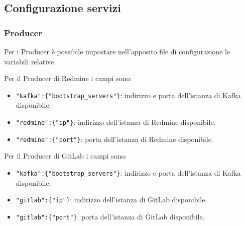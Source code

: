\subsection{Configurazione servizi \progetto}\label{var}

	\subsubsection{Producer}
	Per i Producer è possibile impostare nell'apposito file di configurazione le variabili relative.

	Per il Producer di Redmine i campi sono:
	\begin{itemize}
		\item\texttt{"kafka":\{"bootstrap\_servers"\}}: indirizzo e porta dell'istanza di Kafka disponibile.
		\item\texttt{"redmine":\{"ip"\}}: indirizzo dell'istanza di Redmine disponibile.
		\item\texttt{"redmine":\{"port"\}}: porta dell'istanza di Redmine disponibile.
	\end{itemize}

	Per il Producer di GitLab i campi sono:
	\begin{itemize}
		\item\texttt{"kafka":\{"bootstrap\_servers"\}}: indirizzo e porta dell'istanza di Kafka disponibile.
		\item\texttt{"gitlab":\{"ip"\}}: indirizzo dell'istanza di GitLab disponibile.
		\item\texttt{"gitlab":\{"port"\}}: porta dell'istanza di GitLab disponibile.
	\end{itemize}

